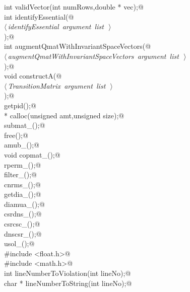 \documentclass{article}
\begin{document}
\begin{flushleft}
\begin{minipage}{\linewidth}
\begin{list}{}{}
\mbox{}\verb@static int validVector(int numRows,double * vec);@\\
\mbox{}\verb@static int identifyEssential(@\\
\mbox{}\verb@@\hbox{$\langle\,${\itshape identifyEssential argument list}\nobreak\ {\footnotesize {}}$\,\rangle$}\verb@@\\
\mbox{}\verb@);@\\
\mbox{}\verb@static int augmentQmatWithInvariantSpaceVectors(@\\
\mbox{}\verb@@\hbox{$\langle\,${\itshape augmentQmatWithInvariantSpaceVectors argument list}\nobreak\ {\footnotesize {}}$\,\rangle$}\verb@@\\
\mbox{}\verb@);@\\
\mbox{}\verb@static void constructA(@\\
\mbox{}\verb@@\hbox{$\langle\,${\itshape TransitionMatrix argument list}\nobreak\ {\footnotesize {}}$\,\rangle$}\verb@@\\
\mbox{}\verb@);@\\
\mbox{}\verb@long getpid();@\\
\mbox{}\verb@void * calloc(unsigned amt,unsigned size);@\\
\mbox{}\verb@void submat_();@\\
\mbox{}\verb@void free();@\\
\mbox{}\verb@void amub_();@\\
\mbox{}\verb@extern void copmat_();@\\
\mbox{}\verb@void rperm_();@\\
\mbox{}\verb@void filter_();@\\
\mbox{}\verb@void cnrms_();@\\
\mbox{}\verb@void getdia_();@\\
\mbox{}\verb@void diamua_();@\\
\mbox{}\verb@void csrdns_();@\\
\mbox{}\verb@void csrcsc_();@\\
\mbox{}\verb@void dnscsr_();@\\
\mbox{}\verb@void usol_();@\\
\mbox{}\verb@#include <float.h>@\\
\mbox{}\verb@#include <math.h>@\\
\mbox{}\verb@static int lineNumberToViolation(int lineNo);@\\
\mbox{}\verb@static char * lineNumberToString(int lineNo);@\\
\mbox{}\verb@@{\NWsep}
\end{list}

\end{minipage}
\end{flushleft}
\end{document}
